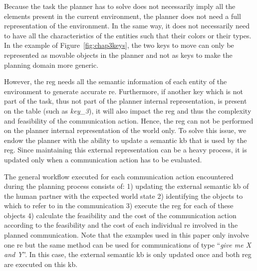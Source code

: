 \documentclass[a4paper,11pt,twoside]{StyleThese}
\begin{document}
Because the task the planner has to solve does not necessarily imply all the elements present in the current environment, the planner does not need a full representation of the environment. In the same way, it does not necessarily need to have all the characteristics of the entities such that their colors or their types. In the example of Figure~\ref{fig:chap3keys}, the two keys to move can only be represented as movable objects in the planner and not as keys to make the planning domain more generic. 

However, the \acrshort{reg} needs all the semantic information of each entity of the environment to generate accurate \acrshort{re}. Furthermore, if another key which is not part of the task, thus not part of the planner internal representation, is present on the table (such as \textit{key\_3}), it will also impact the \acrshort{reg} and thus the complexity and feasibility of the communication action. 
Hence, the \acrshort{reg} can not be performed on the planner internal representation of the world only.
To solve this issue, we endow the planner with the ability to update a semantic \acrshort{kb} that is used by the \acrshort{reg}. Since maintaining this external representation can be a heavy process, it is updated only when a communication action has to be evaluated.

The general workflow executed for each communication action encountered during the planning process consists of: 1) updating the external semantic \acrshort{kb} of the human partner with the expected world state 2) identifying the objects to which to refer to in the communication 3) execute the \acrshort{reg} for each of these objects 4) calculate the feasibility and the cost of the communication action according to the feasibility and the cost of each individual \acrshort{re} involved in the planned communication. Note that the examples used in this paper only involve one \acrshort{re} but the same method can be used for communications of type ``\textit{give me X and Y}''. In this case, the external semantic \acrshort{kb} is only updated once and both \acrshort{reg} are executed on this \acrshort{kb}.

\end{document}
